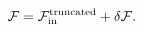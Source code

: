 \begin{equation}\label{Fsum}
\mathcal{F}=\mathcal{F}_{{\rm in}}^{{\rm truncated}} + \delta
\mathcal{F}.
\end{equation}

